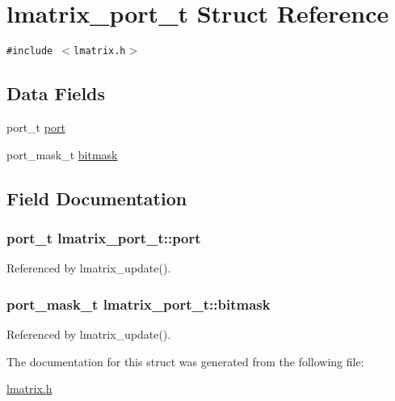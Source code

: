 \hypertarget{structlmatrix__port__t}{
\section{lmatrix\_\-port\_\-t Struct Reference}
\label{structlmatrix__port__t}
}
{\tt \#include $<$lmatrix.h$>$}

\subsection*{Data Fields}
\begin{CompactItemize}
\item 
port\_\-t \hyperlink{structlmatrix__port__t_a2f4ee23b2d307eba95ed0b7e5839893}{port}
\item 
port\_\-mask\_\-t \hyperlink{structlmatrix__port__t_38c85a35de9f2a2ecde6d5fc61ee2631}{bitmask}
\end{CompactItemize}


\subsection{Field Documentation}
\hypertarget{structlmatrix__port__t_a2f4ee23b2d307eba95ed0b7e5839893}{
\subsubsection{\setlength{\rightskip}{0pt plus 5cm}port\_\-t {\bf lmatrix\_\-port\_\-t::port}}}
\label{structlmatrix__port__t_a2f4ee23b2d307eba95ed0b7e5839893}




Referenced by lmatrix\_\-update().\hypertarget{structlmatrix__port__t_38c85a35de9f2a2ecde6d5fc61ee2631}{
\subsubsection{\setlength{\rightskip}{0pt plus 5cm}port\_\-mask\_\-t {\bf lmatrix\_\-port\_\-t::bitmask}}}
\label{structlmatrix__port__t_38c85a35de9f2a2ecde6d5fc61ee2631}




Referenced by lmatrix\_\-update().

The documentation for this struct was generated from the following file:\begin{CompactItemize}
\item 
\hyperlink{lmatrix_8h}{lmatrix.h}\end{CompactItemize}
